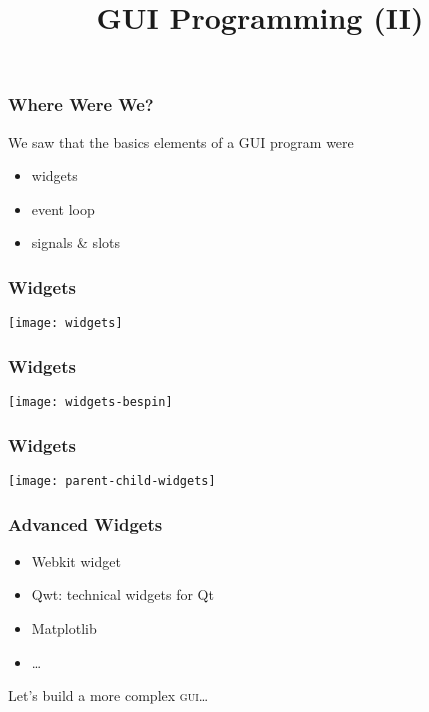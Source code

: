 
\title{GUI Programming (II)}

\frame{\maketitle}

\begin{frame}[fragile]
\frametitle{Where Were We?}
We saw that the basics elements of a GUI program were
\begin{itemize}
\item widgets
\item event loop
\item signals \& slots
\end{itemize}
\end{frame}

\begin{frame}[fragile]
\frametitle{Widgets}

\centering
\texttt{[image: widgets]}

\end{frame}

\begin{frame}[fragile]
\frametitle{Widgets}

\centering
\texttt{[image: widgets-bespin]}

\end{frame}

\begin{frame}[fragile]
\frametitle{Widgets}

\centering
\texttt{[image: parent-child-widgets]}


\end{frame}

\begin{frame}[fragile]
\frametitle{Advanced Widgets}
\begin{itemize}
\item Webkit widget
\item Qwt: technical widgets for Qt
\item Matplotlib
\item \ldots
\end{itemize}
\end{frame}

\begin{frame}[fragile]

\bigskip
\bigskip
\bigskip
Let's build a more complex \textsc{gui}\ldots
\end{frame}

